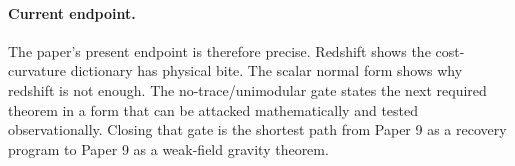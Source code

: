 \documentclass[11pt]{article}
\theoremstyle{remark}
\begin{document}
\paragraph{Current endpoint.}
The paper's present endpoint is therefore precise.  Redshift shows the cost-curvature dictionary has physical bite.  The scalar normal form shows why redshift is not enough.  The no-trace/unimodular gate states the next required theorem in a form that can be attacked mathematically and tested observationally.  Closing that gate is the shortest path from Paper 9 as a recovery program to Paper 9 as a weak-field gravity theorem.
\end{document}
